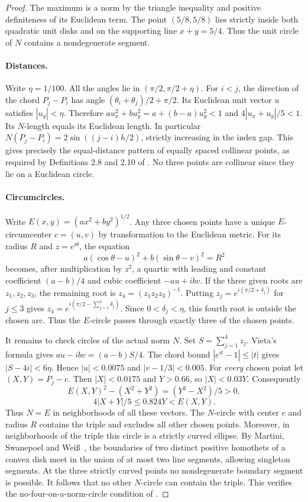 \documentclass[11pt]{article}
\begin{document}
\begin{proof}
The maximum is a norm by the triangle inequality and positive definiteness of
its Euclidean term. The point $(5/8,5/8)$ lies strictly inside both quadratic
unit disks and on the supporting line $x+y=5/4$. Thus the unit circle of
$N$ contains a nondegenerate segment.

\paragraph{Distances.} Write $\eta=1/100$. All the angles lie in
$(\pi/2,\pi/2+\eta)$. For $i<j$, the direction of the chord $P_j-P_i$
has angle $(\theta_i+\theta_j)/2+\pi/2$. Its Euclidean unit vector $u$
satisfies $|u_y|<\eta$. Therefore $au_x^2+bu_y^2=a+(b-a)u_y^2<1$
and $4|u_x+u_y|/5<1$. Its $N$-length equals its Euclidean length.
In particular $N(P_j-P_i)=2\sin((j-i)h/2)$, strictly increasing in
the index gap. This gives precisely the equal-distance pattern of equally
spaced collinear points, as required by Definitions 2.8 and 2.10 of
\cite{fish}. No three points are collinear since they lie on a Euclidean circle.

\paragraph{Circumcircles.} Write $E(x,y)=(ax^2+by^2)^{1/2}$.
Any three chosen points have a unique $E$-circumcenter $c=(u,v)$
by transformation to the Euclidean metric. For its radius $R$ and
$z=e^{i\theta}$, the equation
\[
 a(\cos\theta-u)^2+b(\sin\theta-v)^2=R^2
\]
becomes, after multiplication by $z^2$, a quartic with leading and
constant coefficient $(a-b)/4$ and cubic coefficient $-au+ibv$.
If the three given roots are $z_1,z_2,z_3$, the remaining root is
$z_4=(z_1z_2z_3)^{-1}$. Putting $z_j=e^{i(\pi/2+\delta_j)}$
for $j\le3$ gives $z_4=e^{i(\pi/2-\sum_{j=1}^3\delta_j)}$.
Since $0<\delta_j<\eta$, this fourth root is outside the chosen arc.
Thus the $E$-circle passes through exactly three of the chosen points.

It remains to check circles of the actual norm $N$. Set $S=\sum_{j=1}^4z_j$.
Vieta's formula gives $au-ibv=(a-b)S/4$. The chord bound
$|e^{it}-1|\le |t|$ gives $|S-4i|<6\eta$. Hence
$|u|<0.0075$ and $|v-1/3|<0.005$. For \emph{every} chosen point let
$(X,Y)=P_j-c$. Then $|X|<0.0175$ and $Y>0.66$, so
$|X|<0.03Y$. Consequently
\[
 E(X,Y)^2-(X^2+Y^2)=(Y^2-X^2)/5>0,
 \]
\[
4|X+Y|/5\le 0.824Y < E(X,Y).
\]
Thus $N=E$ in neighborhoods of all these vectors. The $N$-circle with center
$c$ and radius $R$ contains the triple and excludes all other chosen points.
Moreover, in neighborhoods of the triple this circle is a strictly curved
ellipse. By Martini, Swanepoel and Wei\ss\ \cite[Proposition 21]{survey}, the
boundaries of two distinct positive homothets of a convex disk meet in the
union of at most two line segments, allowing singleton segments. At the
three strictly curved points no nondegenerate boundary segment is possible.
It follows that no other $N$-circle can contain the triple. This verifies
the no-four-on-a-norm-circle condition of \cite[Definition 4.4]{fish}.


\end{proof}
\end{document}
